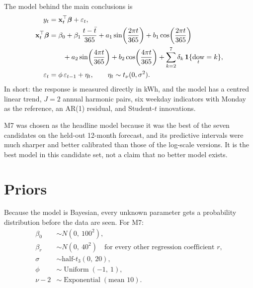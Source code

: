 \documentclass[11pt]{article}
\DeclareMathOperator{\dow}{dow}
\DeclareMathOperator{\Unif}{Uniform}
\DeclareMathOperator{\Expo}{Exponential}
\begin{document}
The model behind the main conclusions is
\begin{align}
y_t &= \mathbf{x}_t^{\top}\boldsymbol\beta + \varepsilon_t, \label{eq:m7}\\
\mathbf{x}_t^{\top}\boldsymbol\beta
  &= \beta_0 + \beta_1\,\frac{t-\bar t}{365}
   + a_1\sin\!\left(\frac{2\pi t}{365}\right) + b_1\cos\!\left(\frac{2\pi t}{365}\right) \notag\\
  &\qquad + a_2\sin\!\left(\frac{4\pi t}{365}\right) + b_2\cos\!\left(\frac{4\pi t}{365}\right)
   + \sum_{k=2}^{7}\delta_k\,\mathbf{1}\{\dow_t = k\}, \label{eq:m7mean}\\
\varepsilon_t &= \phi\,\varepsilon_{t-1} + \eta_t,
  \qquad \eta_t \sim t_\nu(0,\sigma^2). \label{eq:m7err}
\end{align}
In short: the response is measured directly in kWh, and the model has a centred
linear trend, $J = 2$ annual harmonic pairs, six weekday indicators with Monday
as the reference, an AR(1) residual, and Student-$t$ innovations.

M7 was chosen as the headline model because it was the best of the seven
candidates on the held-out 12-month forecast, and its predictive intervals were
much sharper and better calibrated than those of the log-scale versions. It is
the best model in this candidate set, not a claim that no better model exists.

\section{Priors}

Because the model is Bayesian, every unknown parameter gets a probability
distribution before the data are seen. For M7:
\begin{align}
\beta_0 &\sim N(0,\ 100^2), \label{eq:prior-b0}\\
\beta_r &\sim N(0,\ 40^2) \quad \text{for every other regression coefficient } r, \label{eq:prior-b}\\
\sigma &\sim \text{half-}t_3(0,\ 20), \label{eq:prior-sigma}\\
\phi &\sim \Unif(-1,\ 1), \label{eq:prior-phi}\\
\nu - 2 &\sim \Expo(\text{mean } 10). \label{eq:prior-nu}
\end{align}
\end{document}
